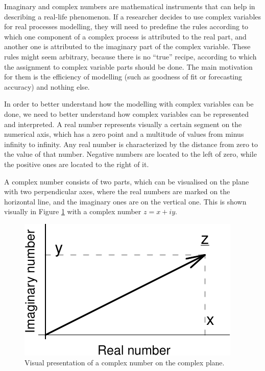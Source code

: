 \documentclass[
]{book}
\begin{document}
Imaginary and complex numbers are mathematical instruments that can help in describing a real-life phenomenon. If a researcher decides to use complex variables for real processes modelling, they will need to predefine the rules according to which one component of a complex process is attributed to the real part, and another one is attributed to the imaginary part of the complex variable. These rules might seem arbitrary, because there is no ``true'' recipe, according to which the assignment to complex variable parts should be done. The main motivation for them is the efficiency of modelling (such as goodness of fit or forecasting accuracy) and nothing else.

In order to better understand how the modelling with complex variables can be done, we need to better understand how complex variables can be represented and interpreted. A real number represents visually a certain segment on the numerical axis, which has a zero point and a multitude of values from minus infinity to infinity. Any real number is characterized by the distance from zero to the value of that number. Negative numbers are located to the left of zero, while the positive ones are located to the right of it.

A complex number consists of two parts, which can be visualised on the plane with two perpendicular axes, where the real numbers are marked on the horizontal line, and the imaginary ones are on the vertical one. This is shown visually in Figure \ref{fig:complexPlane} with a complex number \(z=x+iy\).

\begin{figure}
\centering
\includegraphics{Svetunkov---Svetunkov---Complex-Dynamic-Models_files/figure-latex/complexPlane-1.pdf}
\caption{\label{fig:complexPlane}Visual presentation of a complex number on the complex plane.}
\end{figure}
\end{document}
